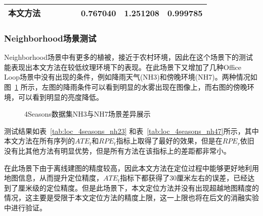 \begin{table}
\begin{tabular}{lccccccc}
本文方法               &                                                                                &                     &                     &                     & \cellcolor[HTML]{FFCCC9}\textbf{0.767040} & \cellcolor[HTML]{FFCCC9}\textbf{1.251208} & 0.999785          \\ \bottomrule
\end{tabular}
\label{tab:loc_4seasons_of345}
\end{table}

\subsubsection{Neighborhood场景测试}

Neighborhood场景中有更多的植被，接近于农村环境，因此在这个场景下的测试能表现出本文方法在较低纹理环境下的表现。在此场景下又增加了几种Office Loop场景中没有出现的条件，例如降雨天气(NH3)和傍晚环境(NH7)。两种情况如图~\ref{fig:scene_nh} 所示，左图的降雨条件可以看到明显的水雾出现在图像上，而右图的傍晚环境，可以看到明显的亮度降低。

\begin{figure}
  \centering
  \caption{4Seasons数据集NH3与NH7场景差异展示}
  \label{fig:scene_nh}
\end{figure}


测试结果如表~\ref{tab:loc_4seasons_nh23} 和表~\ref{tab:loc_4seasons_nh47}所示，其中本文方法在所有序列的$ATE_t$和$RPE_t$指标上取得了最好的效果，但是在$RPE_r$依旧没有比其他方法有明显优势，但是所有方法在该指标上的差距都非常小。

在此场景下由于离线建图的精度较高，因此本文方法在定位过程中能够更好地利用地图信息，从而提升定位精度，$ATE_t$指标下都获得了30厘米左右的误差，已经达到了厘米级的定位精度。但是此场景下，本文定位方法并没有出现超越地图精度的情况，这主要是受限于本文定位方法的精度上限，这一上限也将在后文的消融实验中进行验证。

